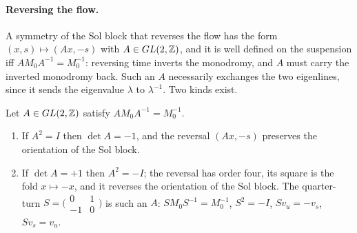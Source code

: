 \paragraph{Reversing the flow.}
A symmetry of the Sol block that reverses the flow has the form
$(x,s)\mapsto(Ax,-s)$ with $A\in GL(2,\mathbb{Z})$, and it is well defined on the
suspension iff $AM_{0}A^{-1}=M_{0}^{-1}$: reversing time inverts the
monodromy, and $A$ must carry the inverted monodromy back. Such an $A$
necessarily exchanges the two eigenlines, since it sends the eigenvalue
$\lambda$ to $\lambda^{-1}$. Two kinds exist.

\begin{proposition}\label{prop:reversal}
Let $A\in GL(2,\mathbb{Z})$ satisfy $AM_{0}A^{-1}=M_{0}^{-1}$.
\begin{enumerate}[label=(\roman*),nosep]
\item If $A^{2}=I$ then $\det A=-1$, and the reversal $(Ax,-s)$ preserves the
orientation of the Sol block.
\item If $\det A=+1$ then $A^{2}=-I$; the reversal has order four, its square
is the fold $x\mapsto-x$, and it reverses the orientation of the Sol block.
The quarter-turn $S=\bigl(\begin{smallmatrix}0&1\\-1&0\end{smallmatrix}\bigr)$
is such an $A$: $SM_{0}S^{-1}=M_{0}^{-1}$, $S^{2}=-I$, $Sv_{u}=-v_{s}$,
$Sv_{s}=v_{u}$.
\end{enumerate}
\end{proposition}


